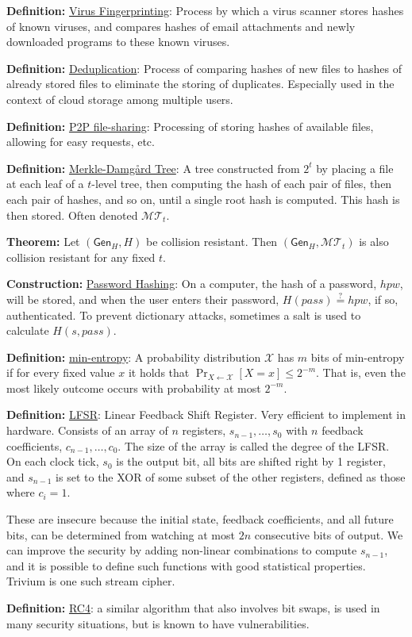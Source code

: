 \documentclass[10pt]{article}
\newcommand{\MMM}{\mathcal{M}}
\newcommand{\XXX}{\mathcal{X}}
\newcommand{\TTT}{\mathcal{T}}
\newcommand{\defn}[1]{{\bf Definition:} \underline{#1}}
\newcommand{\thm}[1]{{\bf Theorem:} \underline{#1}}
\newcommand{\con}[1]{{\bf Construction:} \underline{#1}}
\newcommand{\Gen}{\mathsf{Gen}}
\newcommand{\from}{\leftarrow}
\begin{document}
\begin{multicols}{4}
\defn{Virus Fingerprinting}: Process by which a virus scanner stores hashes of known viruses, and compares hashes of email attachments and newly downloaded programs to these known viruses.

\defn{Deduplication}: Process of comparing hashes of new files to hashes of already stored files to eliminate the storing of duplicates. Especially used in the context of cloud storage among multiple users.

\defn{P2P file-sharing}: Processing of storing hashes of available files, allowing for easy requests, etc.

\defn{Merkle-Damg\r{a}rd Tree}: A tree constructed from $2^t$ by placing a file at each leaf of a $t$-level tree, then computing the hash of each pair of files, then each pair of hashes, and so on, until a single root hash is computed. This hash is then stored. Often denoted $\MMM\TTT_t$.

\thm{}Let $(\Gen_H,H)$ be collision resistant. Then $(\Gen_H,\MMM\TTT_t)$ is also collision resistant for any fixed $t$.

\con{Password Hashing}: On a computer, the hash of a password, $hpw$, will be stored, and when the user enters their password, $H(pass)\overset{?}{=}hpw$, if so, authenticated. To prevent dictionary attacks, sometimes a salt is used to calculate $H(s,pass)$.

\defn{min-entropy}: A probability distribution $\XXX$ has $m$ bits of min-entropy if for every fixed value $x$ it holds that $\Pr_{X\from\XXX}[X=x]\leq2^{-m}$. That is, even the most likely outcome occurs with probability at most $2^{-m}$.

\defn{LFSR}: Linear Feedback Shift Register. Very efficient to implement in hardware. Consists of an array of $n$ registers, $s_{n-1},\dots,s_0$ with $n$ feedback coefficients, $c_{n-1},\dots,c_0$. The size of the array is called the degree of the LFSR. On each clock tick, $s_0$ is the output bit, all bits are shifted right by 1 register, and $s_{n-1}$ is set to the XOR of some subset of the other registers, defined as those where $c_i=1$.

These are insecure because the initial state, feedback coefficients, and all future bits, can be determined from watching at most $2n$ consecutive bits of output. We can improve the security by adding non-linear combinations to compute $s_{n-1}$, and it is possible to define such functions with good statistical properties. Trivium is one such stream cipher.

\defn{RC4}: a similar algorithm that also involves bit swaps, is used in many security situations, but is known to have vulnerabilities.


\end{multicols}
\end{document}
